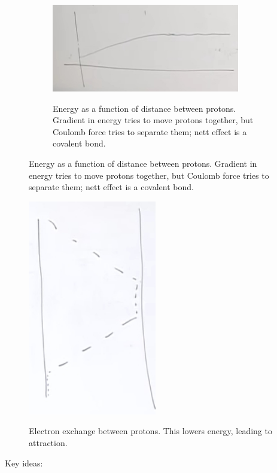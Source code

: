 \documentclass[]{article}
\begin{document}
\begin{figure}[H]
\begin{subfigure}[t]{0.45\textwidth}
		\caption{Energy as a function of distance between protons. Gradient in energy tries to move protons together, but Coulomb force tries to separate them; nett effect is a covalent bond.}
		\includegraphics[width=0.9\textwidth]{2proton1ElectronEnergy}\label{fig:2proton1ElectronEnergy}
	\end{subfigure}

\end{figure}

\begin{figure}[H]
	\caption{Electron exchange between protons. This lowers energy, leading to attraction.}
	\includegraphics[width=0.5\textwidth]{2proton1ElectronHopping}\label{fig:2proton1ElectronHopping}
\end{figure}

Key ideas: 
\end{document}
